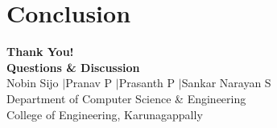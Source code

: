 \documentclass[aspectratio=169,10pt]{beamer}
\begin{document}
\section{Conclusion}



\begin{frame}[plain]
  \centering
  \vspace{1.5cm}
  {\Huge \textbf{\color{lavenderDark}Thank You!}}\\[1.0em]
  {\Large \textbf{\color{lavenderMedium}Questions \& Discussion}}\\[1.5em]
  {\normalsize \color{prismDark}
    Nobin Sijo \quad$\vert$\quad Pranav P \quad$\vert$\quad Prasanth P \quad$\vert$\quad Sankar Narayan S\\[0.5em]
    \color{prismSlate}Department of Computer Science \& Engineering\\
    College of Engineering, Karunagappally
  }
\end{frame}
\end{document}
